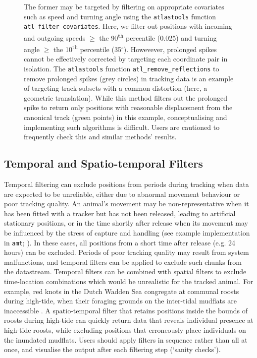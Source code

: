 \documentclass[10pt,paper=a4,headings=standardclasses
]{scrartcl}
\begin{document}
\begin{figure}[h!]
{    The former may be targeted by filtering on appropriate covariates such as speed and turning angle using the \texttt{atlastools} function \texttt{atl\_filter\_covariates}.
    Here, we filter out positions with incoming and outgoing speeds $\geq$ the 90\textsuperscript{th} percentile (0.025) and turning angle $\geq$ the 10\textsuperscript{th} percentile (35$^{\circ}$).
    Howevever, prolonged spikes cannot be effectively corrected by targeting each coordinate pair in isolation.
    The \texttt{atlastools} function \texttt{atl\_remove\_reflections} to remove prolonged spikes (grey circles) in tracking data is an example of targeting track subsets with a common distortion (here, a geometric translation).
    While this method filters out the prolonged spike to return only positions with reasonable displacement from the canonical track (green points) in this example, conceptualising and implementing such algorithms is difficult. 
    Users are cautioned to frequently check this and similar methods' results.
    }
    \label{fig:figure_simulated_data}
\end{figure}

\subsection{Temporal and Spatio-temporal Filters}

Temporal filtering can exclude positions from periods during tracking when data are expected to be unreliable, either due to abnormal movement behaviour or poor tracking quality. 
An animal’s movement may be non-representative when it has been fitted with a tracker but has not been released, leading to artificial stationary positions, or in the time shortly after release when its movement may be influenced by the stress of capture and handling (see example implementation in \texttt{amt}; \citet{signer2019}). 
In these cases, all positions from a short time after release (e.g. 24 hours) can be excluded. 
Periods of poor tracking quality may result from system malfunctions, and temporal filters can be applied to exclude such chunks from the datastream. 
Temporal filters can be combined with spatial filters to exclude time-location combinations which would be unrealistic for the tracked animal. 
For example, red knots in the Dutch Wadden Sea congregate at communal roosts during high-tide, when their foraging grounds on the inter-tidal mudflats are inaccessible \citep{vangils2006}.
A spatio-temporal filter that retains positions inside the bounds of roosts during high-tide can quickly return data that reveals individual presence at high-tide roosts, while excluding positions that erroneously place individuals on the inundated mudflats.
Users should apply filters in sequence rather than all at once, and visualise the output after each filtering step (`sanity checks').
\end{document}

